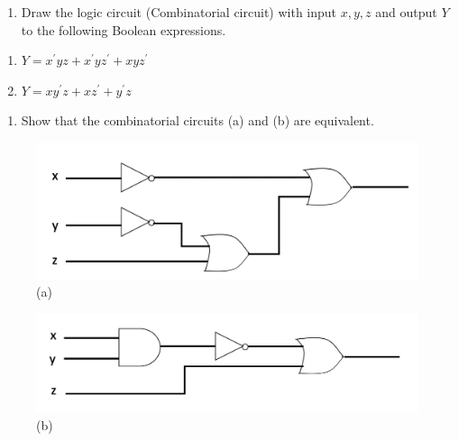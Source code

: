\documentclass[]{book}
\providecommand{\tightlist}{%
  \setlength{\itemsep}{0pt}\setlength{\parskip}{0pt}}
\begin{document}
\begin{enumerate}
\def\labelenumi{\arabic{enumi}.}
\setcounter{enumi}{11}
\tightlist
\item
  Draw the logic circuit (Combinatorial circuit) with input \(x,y,z\) and output \(Y\) to the following Boolean expressions.
\end{enumerate}

\begin{enumerate}
\def\labelenumi{\alph{enumi})}
\tightlist
\item
  \(Y = x^\prime yz+x^\prime yz^\prime +xyz^\prime\)
\item
  \(Y = x y^\prime z+xz^\prime +y^\prime z\)
\end{enumerate}

\newpage

\begin{enumerate}
\def\labelenumi{\arabic{enumi}.}
\setcounter{enumi}{12}
\tightlist
\item
  Show that the combinatorial circuits (a) and (b) are equivalent.
\end{enumerate}

\begin{figure}

{\centering \includegraphics[width=0.8\linewidth]{figure/networkQ12a} 

}

\caption{(a)}\label{fig:unnamed-chunk-5}
\end{figure}

\begin{figure}

{\centering \includegraphics[width=0.8\linewidth]{figure/networkQ12b} 

}

\caption{(b)}\label{fig:unnamed-chunk-6}
\end{figure}
\end{document}
